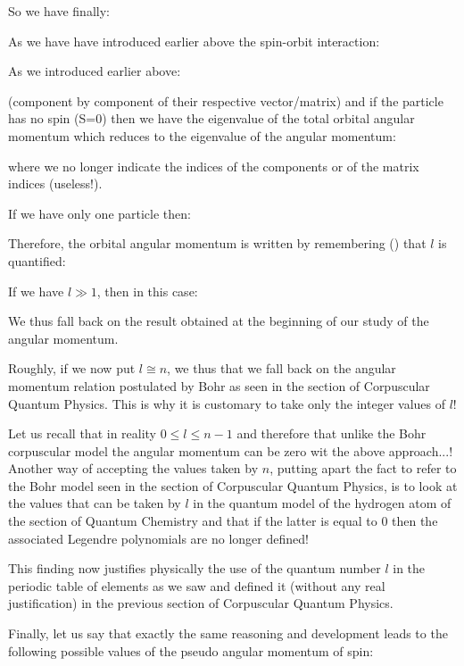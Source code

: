 	So we have finally:
	
	As we have have introduced earlier above the spin-orbit interaction:
	
	As we introduced earlier above:
	
	(component by component of their respective vector/matrix) and if the particle has no spin (S=0) then we have the eigenvalue of the total orbital angular momentum which reduces to the eigenvalue of the angular momentum:
	
	where we no longer indicate the indices of the components or of the matrix indices (useless!).
	
	If we have only one particle then:
	
	Therefore, the orbital angular momentum is written by remembering () that $l$ is quantified:
	
	If we have $l\gg 1$, then in this case:
	
	We thus fall back on the result obtained at the beginning of our study of the angular momentum.
	
	Roughly, if we now put $l\cong n$, we thus that we fall back on the angular momentum relation postulated by Bohr as seen in the section of Corpuscular Quantum Physics. This is why it is customary to take only the integer values of $l$!
	
	\begin{tcolorbox}[title=Remark,colframe=black,arc=10pt]
	Let us recall that in reality $0\le l \le n-1$ and therefore that unlike the Bohr corpuscular model the angular momentum can be zero wit the above approach...! Another way of accepting the values taken by $n$, putting apart the fact to refer to the Bohr model seen in the section of Corpuscular Quantum Physics, is to look at the values that can be taken by $l$ in the quantum model of the hydrogen atom of the section of Quantum Chemistry and that if the latter is equal to $0$ then the associated Legendre polynomials are no longer defined!
	\end{tcolorbox}
	This finding now justifies physically the use of the quantum number $l$ in the periodic table of elements as we saw and defined it  (without any real justification) in the previous section of Corpuscular Quantum Physics.

	Finally, let us say that exactly the same reasoning and development leads to the following possible values of the pseudo angular momentum of spin:
	
